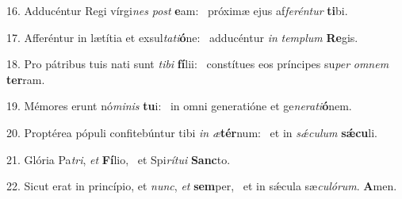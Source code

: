 16. Adducéntur Regi vírgi\textit{nes} \textit{post} \textbf{e}am: \ast\  próximæ ejus af\textit{fe}\textit{rén}\textit{tur} \textbf{ti}bi.\

17. Afferéntur in lætítia et exsul\textit{ta}\textit{ti}\textbf{ó}ne: \ast\  adducéntur \textit{in} \textit{tem}\textit{plum} \textbf{Re}gis.\

18. Pro pátribus tuis nati sunt \textit{ti}\textit{bi} \textbf{fí}lii: \ast\  constítues eos príncipes su\textit{per} \textit{om}\textit{nem} \textbf{ter}ram.\

19. Mémores erunt nó\textit{mi}\textit{nis} \textbf{tu}i: \ast\  in omni generatióne et ge\textit{ne}\textit{ra}\textit{ti}\textbf{ó}nem.\

20. Proptérea pópuli confitebúntur tibi \textit{in} \textit{æ}\textbf{tér}num: \ast\  et in \textit{sǽ}\textit{cu}\textit{lum} \textbf{sǽ}\textbf{cu}li.\

21. Glória Pa\textit{tri}, \textit{et} \textbf{Fí}lio, \ast\  et Spi\textit{rí}\textit{tu}\textit{i} \textbf{Sanc}to.\

22. Sicut erat in princípio, et \textit{nunc}, \textit{et} \textbf{sem}per, \ast\  et in sǽcula sæ\textit{cu}\textit{ló}\textit{rum}. \textbf{A}men.\

